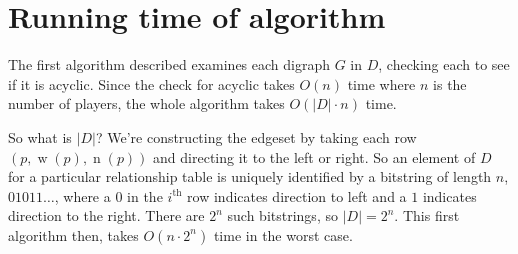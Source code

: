\documentclass[12pt,x11names, rgb]{article}
\DeclareMathOperator{\w}{w}
\DeclareMathOperator{\n}{n}
\begin{document}
\begin{center}
    \end{center}

\section{Running time of algorithm}
    The first algorithm described examines each digraph $G$ in $D$, checking each to see if it is acyclic. Since the check for acyclic takes $O(n)$ time where $n$ is the number of players, the whole algorithm takes $O(\lvert D \rvert \cdot n)$ time. 

    So what is $\lvert D \rvert$? We're constructing the edgeset by taking each row $(p, \w(p), \n(p))$ and directing it to the left or right. So an element of $D$ for a particular relationship table is uniquely identified by a bitstring of length $n$, $01011\ldots$, where a $0$ in the $i^{\text{th}}$ row indicates direction to left and a $1$ indicates direction to the right. There are $2^n$ such bitstrings, so $\lvert D \rvert = 2^n$. This first algorithm then, takes $O(n \cdot 2^n)$ time in the worst case. 
\end{document}
